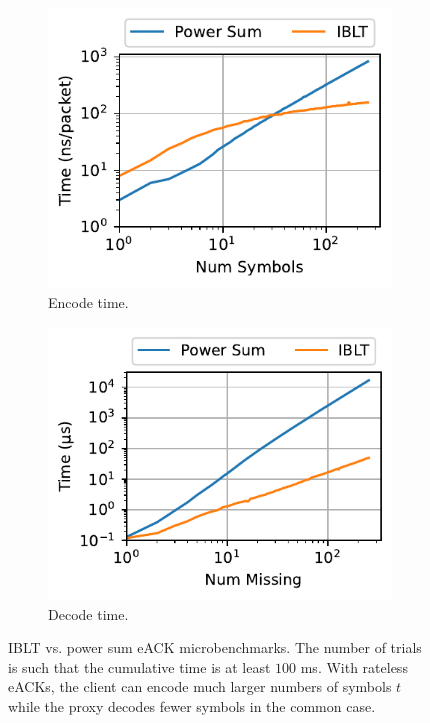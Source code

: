 \begin{figure}[t]
    \centering
    \begin{subfigure}[b]{0.49\linewidth}
        \centering
        \includegraphics[width=\linewidth]{figures/quack_encode.pdf}
        \caption{Encode time.}
        \label{fig:quack:encode}
    \end{subfigure}
    \begin{subfigure}[b]{0.49\linewidth}
        \centering
        \includegraphics[width=\linewidth]{figures/quack_decode.pdf}
        \caption{Decode time.}
        \label{fig:quack:decode}
    \end{subfigure}
    \caption{IBLT vs. power sum eACK microbenchmarks. The number of trials is
     such that the cumulative time is at least $100$ ms. With rateless eACKs,
     the client can encode much larger numbers of symbols $t$ while the proxy
     decodes fewer symbols in the common case.
     }
    \label{fig:quack}
\end{figure}